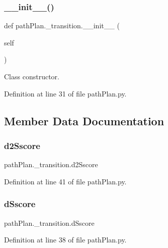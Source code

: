\subsubsection{\texorpdfstring{\+\_\+\+\_\+init\+\_\+\+\_\+()}{\_\_init\_\_()}}
{\footnotesize\ttfamily def path\+Plan.\+\_\+transition.\+\_\+\+\_\+init\+\_\+\+\_\+ (\begin{DoxyParamCaption}\item[{}]{self }\end{DoxyParamCaption})}



Class constructor. 



Definition at line 31 of file path\+Plan.\+py.



\subsection{Member Data Documentation}
\mbox{\label{classpath_plan_1_1__transition_ae82fdb67875ff11e624058a2511ae82a}} 
\subsubsection{\texorpdfstring{d2\+Sscore}{d2Sscore}}
{\footnotesize\ttfamily path\+Plan.\+\_\+transition.\+d2\+Sscore}



Definition at line 41 of file path\+Plan.\+py.

\mbox{\label{classpath_plan_1_1__transition_ab8b5b251fbf9b8ac74498e0a9a92e14d}} 
\subsubsection{\texorpdfstring{d\+Sscore}{dSscore}}
{\footnotesize\ttfamily path\+Plan.\+\_\+transition.\+d\+Sscore}



Definition at line 38 of file path\+Plan.\+py.

